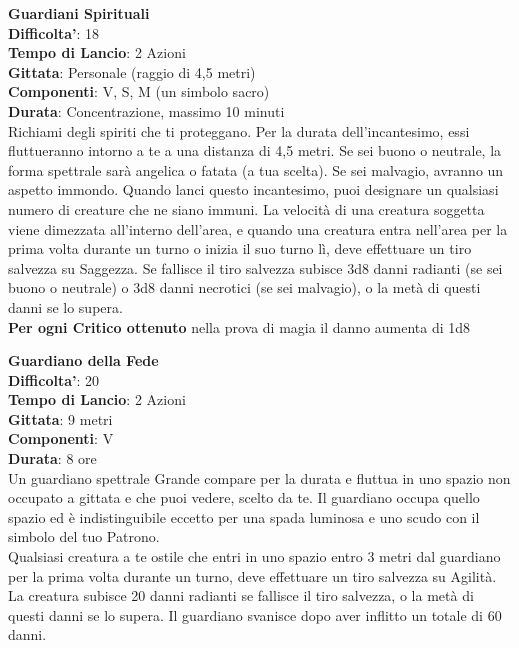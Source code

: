 \begin{multicols}{2}
\medskip\textbf{Guardiani Spirituali}\\
\textbf{Difficolta'}: 18\\
\textbf{Tempo di Lancio}: 2 Azioni\\
\textbf{Gittata}: Personale (raggio di 4,5 metri)\\
\textbf{Componenti}: V, S, M (un simbolo sacro)\\
\textbf{Durata}: Concentrazione, massimo 10 minuti\\
Richiami degli spiriti che ti proteggano. Per la durata dell’incantesimo, essi fluttueranno intorno a te a una distanza di 4,5 metri. Se sei buono o neutrale, la forma spettrale sarà angelica o fatata (a tua scelta). Se sei malvagio, avranno un aspetto immondo. Quando lanci questo incantesimo, puoi designare un qualsiasi numero di creature che ne siano immuni. La velocità di una creatura soggetta viene dimezzata all’interno dell’area, e quando una creatura entra nell’area per la prima volta durante un turno o inizia il suo turno lì, deve effettuare un tiro salvezza su Saggezza. Se fallisce il tiro salvezza subisce 3d8 danni radianti (se sei buono o neutrale) o 3d8 danni necrotici (se sei malvagio), o la metà di questi danni se lo supera.\\
\textbf{Per ogni Critico ottenuto} nella prova di magia  il danno aumenta di 1d8 

\medskip\textbf{Guardiano della Fede}\\
\textbf{Difficolta'}: 20\\
\textbf{Tempo di Lancio}: 2 Azioni\\
\textbf{Gittata}: 9 metri\\
\textbf{Componenti}: V\\
\textbf{Durata}: 8 ore\\
Un guardiano spettrale Grande compare per la durata e fluttua in uno spazio non occupato a gittata e che puoi vedere, scelto da te. Il guardiano occupa quello spazio ed è indistinguibile eccetto per una spada luminosa e uno scudo con il simbolo del tuo Patrono.\\
Qualsiasi creatura a te ostile che entri in uno spazio entro 3 metri dal guardiano per la prima volta durante un turno, deve effettuare un tiro salvezza su Agilità. La creatura subisce 20 danni radianti se fallisce il tiro salvezza, o la metà di questi danni se lo supera. Il guardiano svanisce dopo aver inflitto un totale di 60 danni.


\end{multicols}
